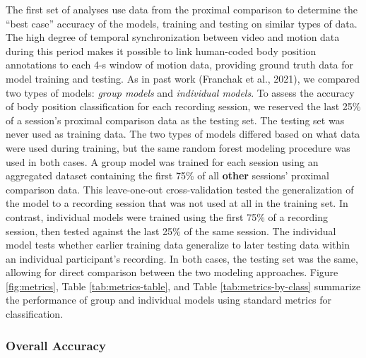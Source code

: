 \documentclass[
  man]{apa6}
\begin{document}
The first set of analyses use data from the proximal comparison to determine the ``best case'' accuracy of the models, training and testing on similar types of data. The high degree of temporal synchronization between video and motion data during this period makes it possible to link human-coded body position annotations to each 4-s window of motion data, providing ground truth data for model training and testing. As in past work (Franchak et al., 2021), we compared two types of models: \emph{group models} and \emph{individual models}. To assess the accuracy of body position classification for each recording session, we reserved the last 25\% of a session's proximal comparison data as the testing set. The testing set was never used as training data. The two types of models differed based on what data were used during training, but the same random forest modeling procedure was used in both cases. A group model was trained for each session using an aggregated dataset containing the first 75\% of all \textbf{other} sessions' proximal comparison data. This leave-one-out cross-validation tested the generalization of the model to a recording session that was not used at all in the training set. In contrast, individual models were trained using the first 75\% of a recording session, then tested against the last 25\% of the same session. The individual model tests whether earlier training data generalize to later testing data within an individual participant's recording. In both cases, the testing set was the same, allowing for direct comparison between the two modeling approaches. Figure \ref{fig:metrics}, Table \ref{tab:metrics-table}, and Table \ref{tab:metrics-by-class} summarize the performance of group and individual models using standard metrics for classification.

\hypertarget{overall-accuracy}{%
\subsubsection{Overall Accuracy}\label{overall-accuracy}}
\end{document}

